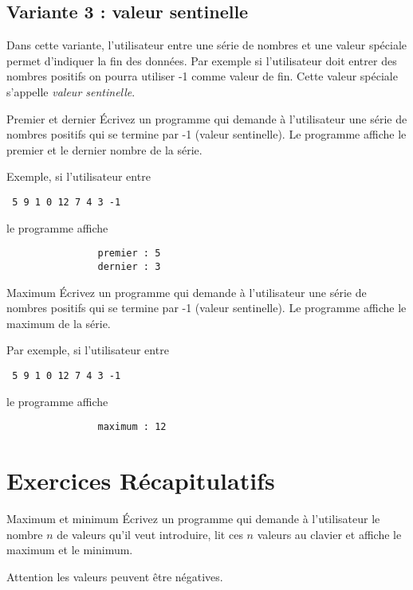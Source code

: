 \documentclass[a4paper,11pt]{article}
\begin{document}
	\subsection{Variante 3 : valeur sentinelle}
	
		Dans cette variante, l'utilisateur entre une série de nombres et une valeur spéciale permet d'indiquer
		la fin des données. Par exemple si l'utilisateur doit entrer des nombres positifs on pourra utiliser -1
		comme valeur de fin. Cette valeur spéciale s'appelle \emph{valeur sentinelle}.

		\begin{Exercice}{Premier et dernier}
			\'Ecrivez un programme qui demande à l'utilisateur une série de nombres positifs 
			qui se termine par -1 (valeur sentinelle). 
			Le programme affiche le premier et le dernier nombre de la série.
		
			Exemple, si l'utilisateur entre
			
			\texttt{ 5 9 1 0 12 7 4 3 -1}

			le programme affiche
			
			\begin{verbatim}
				premier : 5
				dernier : 3
			\end{verbatim}

		\end{Exercice}

		\begin{Exercice}{Maximum}
			\'Ecrivez un programme qui demande à l'utilisateur une série de nombres positifs 
			qui se termine par -1 (valeur sentinelle). 
			Le programme affiche le maximum de la série.
			
			Par exemple, si l'utilisateur entre
			
			\texttt{ 5 9 1 0 12 7 4 3 -1}

			le programme affiche
			
			\begin{verbatim}
				maximum : 12
			\end{verbatim}
		\end{Exercice}


	\section{Exercices Récapitulatifs}

		\begin{Exercice}{Maximum et minimum}
			\'Ecrivez un programme qui demande à l'utilisateur le nombre $n$ de valeurs qu'il veut introduire,
			lit ces $n$ valeurs au clavier et affiche le maximum et le minimum. 
			
			Attention les valeurs peuvent être négatives.
		\end{Exercice}
\end{document}
